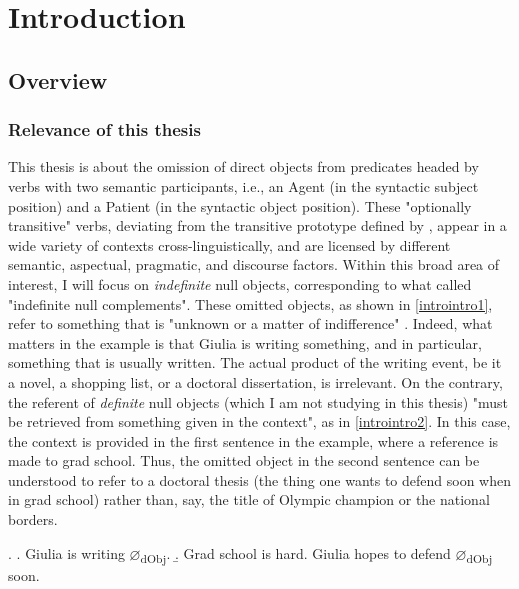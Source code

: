 \setchapterpreamble[u]{\margintoc}
\chapter{Introduction}

\section{Overview} 

\subsection{Relevance of this thesis}

This thesis is about the omission of direct objects from predicates headed by verbs with two semantic participants, i.e., an Agent (in the syntactic subject position) and a Patient (in the syntactic object position). These "optionally transitive" verbs, deviating from the transitive prototype defined by \textcite{HopperThompson1980}, appear in a wide variety of contexts cross-linguistically, and are licensed by different semantic, aspectual, pragmatic, and discourse factors. Within this broad area of interest, I will focus on \textit{indefinite} null objects, corresponding to what \textcite{Fillmore1986} called "indefinite null complements". These omitted objects, as shown in \ref{introintro1}, refer to something that is "unknown or a matter of indifference" \parencite[96]{Fillmore1986}. Indeed, what matters in the example is that Giulia is writing something, and in particular, something that is usually written. The actual product of the writing event, be it a novel, a shopping list, or a doctoral dissertation, is irrelevant. On the contrary, the referent of \textit{definite} null objects (which I am not studying in this thesis) "must be retrieved from something given in the context", as in \ref{introintro2}. In this case, the context is provided in the first sentence in the example, where a reference is made to grad school. Thus, the omitted object in the second sentence can be understood to refer to a doctoral thesis (the thing one wants to defend soon when in grad school) rather than, say, the title of Olympic champion or the national borders.

\ex. \label{introintro} \a. \label{introintro1} Giulia is writing $\varnothing$\textsubscript{dObj}.
\b. \label{introintro2} Grad school is hard. Giulia hopes to defend $\varnothing$\textsubscript{dObj} soon.


